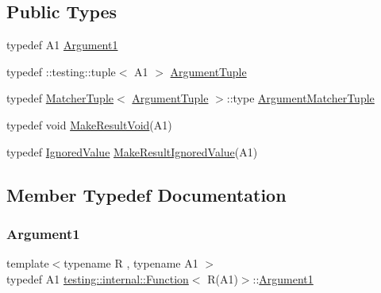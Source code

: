 \subsection*{Public Types}
\begin{DoxyCompactItemize}
\item 
typedef A1 \mbox{\hyperlink{structtesting_1_1internal_1_1Function_3_01R_07A1_08_4_aca36c8586218fd015cc4736dc8d4c14f}{Argument1}}
\item 
typedef \+::testing\+::tuple$<$ A1 $>$ \mbox{\hyperlink{structtesting_1_1internal_1_1Function_3_01R_07A1_08_4_afd48881a58d72658e547a170fb0f2087}{Argument\+Tuple}}
\item 
typedef \mbox{\hyperlink{structtesting_1_1internal_1_1MatcherTuple}{Matcher\+Tuple}}$<$ \mbox{\hyperlink{structtesting_1_1internal_1_1Function_3_01R_07_08_4_ad483c3128c470d8cdb55c3ac1c575c11}{Argument\+Tuple}} $>$\+::type \mbox{\hyperlink{structtesting_1_1internal_1_1Function_3_01R_07A1_08_4_a0e35671ae43c3d3310893e1d6d895d06}{Argument\+Matcher\+Tuple}}
\item 
typedef void \mbox{\hyperlink{structtesting_1_1internal_1_1Function_3_01R_07A1_08_4_aab10495172953eb51fc3940c4c1e890a}{Make\+Result\+Void}}(A1)
\item 
typedef \mbox{\hyperlink{classtesting_1_1internal_1_1IgnoredValue}{Ignored\+Value}} \mbox{\hyperlink{structtesting_1_1internal_1_1Function_3_01R_07A1_08_4_a8fa56b9e05cb029ec7c8415ee352f865}{Make\+Result\+Ignored\+Value}}(A1)
\end{DoxyCompactItemize}


\subsection{Member Typedef Documentation}
\mbox{\label{structtesting_1_1internal_1_1Function_3_01R_07A1_08_4_aca36c8586218fd015cc4736dc8d4c14f}} 
\subsubsection{\texorpdfstring{Argument1}{Argument1}}
{\footnotesize\ttfamily template$<$typename R , typename A1 $>$ \\
typedef A1 \mbox{\hyperlink{structtesting_1_1internal_1_1Function}{testing\+::internal\+::\+Function}}$<$ R(A1)$>$\+::\mbox{\hyperlink{structtesting_1_1internal_1_1Function_3_01R_07A1_08_4_aca36c8586218fd015cc4736dc8d4c14f}{Argument1}}}

